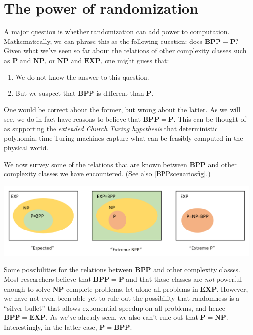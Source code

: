 \section{The power of randomization}\label{The-power-of-randomizatio}

A major question is whether randomization can add power to computation.
Mathematically, we can phrase this as the following question: does
\(\mathbf{BPP}=\mathbf{P}\)? Given what we've seen so far about the
relations of other complexity classes such as \(\mathbf{P}\) and
\(\mathbf{NP}\), or \(\mathbf{NP}\) and \(\mathbf{EXP}\), one might
guess that:

\begin{enumerate}
\def\labelenumi{\arabic{enumi}.}
\item
  We do not know the answer to this question.
\item
  But we suspect that \(\mathbf{BPP}\) is different than \(\mathbf{P}\).
\end{enumerate}

One would be correct about the former, but wrong about the latter. As we
will see, we do in fact have reasons to believe that
\(\mathbf{BPP}=\mathbf{P}\). This can be thought of as supporting the
\emph{extended Church Turing hypothesis} that deterministic
polynomial-time Turing machines capture what can be feasibly computed in
the physical world.

We now survey some of the relations that are known between
\(\mathbf{BPP}\) and other complexity classes we have encountered. (See
also \cref{BPPscenariosfig}.)


\begin{marginfigure}
\centering
\includegraphics[width=\linewidth, height=1.5in, keepaspectratio]{../figure/BPPscenarios.png}
\caption{Some possibilities for the relations between \(\mathbf{BPP}\)
and other complexity classes. Most researchers believe that
\(\mathbf{BPP}=\mathbf{P}\) and that these classes are \emph{not}
powerful enough to solve \(\mathbf{NP}\)-complete problems, let alone
all problems in \(\mathbf{EXP}\). However, we have not even been able
yet to rule out the possibility that randomness is a ``silver bullet''
that allows exponential speedup on all problems, and hence
\(\mathbf{BPP}=\mathbf{EXP}\). As we've already seen, we also can't rule
out that \(\mathbf{P}=\mathbf{NP}\). Interestingly, in the latter case,
\(\mathbf{P}=\mathbf{BPP}\).}
\label{BPPscenariosfig}
\end{marginfigure}

